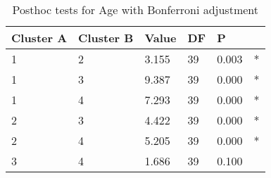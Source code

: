 \begin{table}[h]
\caption{Posthoc tests for Age with Bonferroni adjustment}
\label{tab:posthoc_Age}
\begin{tabular}{llllll}
\toprule
Cluster A & Cluster B & Value & DF & P &   \\
\midrule
1 & 2 & 3.155 & 39 & 0.003 & * \\
1 & 3 & 9.387 & 39 & 0.000 & * \\
1 & 4 & 7.293 & 39 & 0.000 & * \\
2 & 3 & 4.422 & 39 & 0.000 & * \\
2 & 4 & 5.205 & 39 & 0.000 & * \\
3 & 4 & 1.686 & 39 & 0.100 &   \\
\bottomrule
\end{tabular}
\end{table}
